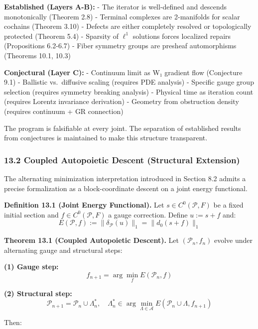 \documentclass[
]{article}
\begin{document}
\textbf{Established (Layers A-B):} - The iterator is well-defined and
descends monotonically (Theorem 2.8) - Terminal complexes are
2-manifolds for scalar cochains (Theorem 3.10) - Defects are either
completely resolved or topologically protected (Theorem 5.4) - Sparsity
of \(\ell^1\) solutions forces localized repairs (Propositions 6.2-6.7)
- Fiber symmetry groups are presheaf automorphisms (Theorems 10.1, 10.3)

\textbf{Conjectural (Layer C):} - Continuum limit as W₁ gradient flow
(Conjecture 9.1) - Ballistic vs.~diffusive scaling (requires PDE
analysis) - Specific gauge group selection (requires symmetry breaking
analysis) - Physical time as iteration count (requires Lorentz
invariance derivation) - Geometry from obstruction density (requires
continuum + GR connection)

The program is falsifiable at every joint. The separation of established
results from conjectures is maintained to make this structure
transparent.

\subsubsection{13.2 Coupled Autopoietic Descent (Structural
Extension)}\label{coupled-autopoietic-descent-structural-extension}

The alternating minimization interpretation introduced in Section 8.2
admits a precise formalization as a block-coordinate descent on a joint
energy functional.

\textbf{Definition 13.1 (Joint Energy Functional).} Let
\(s \in C^0(\mathcal{P}, F)\) be a fixed initial section and
\(f \in C^0(\mathcal{P}, F)\) a gauge correction. Define \(u := s + f\)
and:
\[E(\mathcal{P}, f) := \|\delta_{\mathcal{P}}(u)\|_1 = \|d_0(s + f)\|_1\]

\textbf{Theorem 13.1 (Coupled Autopoietic Descent).} Let
\((\mathcal{P}_n, f_n)\) evolve under alternating gauge and structural
steps:

\textbf{(1) Gauge step:} \[f_{n+1} = \arg\min_f E(\mathcal{P}_n, f)\]

\textbf{(2) Structural step:}
\[\mathcal{P}_{n+1} = \mathcal{P}_n \cup \Lambda_n^*, \quad \Lambda_n^* \in \arg\min_{\Lambda \in \mathcal{A}} E(\mathcal{P}_n \cup \Lambda, f_{n+1})\]

Then:
\end{document}
